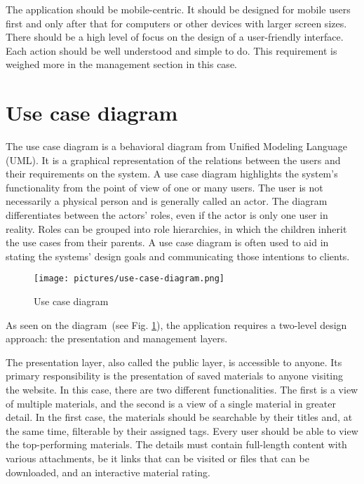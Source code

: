 \documentclass[
  digital,     %
  oneside,     %
  nosansbold,  %
  colorbold, %
  lof,         %
  lot,         %
]{fithesis4}
\newcommand{\imgref}[1]{(see Fig. \ref{fig:#1})}
\begin{document}
The application should be mobile-centric. It should be designed for mobile users first and only after
that for computers or other devices with larger screen sizes. There should be a high level of focus on
the design of a user-friendly interface. Each action should be well understood and simple to do. This
requirement is weighed more in the management section in this case.

\section{Use case diagram}

The use case diagram is a behavioral diagram from Unified Modeling Language (UML). It is a graphical
representation of the relations between the users and their requirements on the system. A use case
diagram highlights the system's functionality from the point of view of one or many users. The user is
not necessarily a physical person and is generally called an actor. The diagram differentiates between
the actors' roles, even if the actor is only one user in reality. Roles can be grouped into role
hierarchies, in which the children inherit the use cases from their parents. A use case diagram is often
used to aid in stating the systems' design goals and communicating those intentions to clients.

\begin{figure}
	\begin{center}
		\begin{minipage}{1\textwidth}
			\texttt{[image: pictures/use-case-diagram.png]}
		\end{minipage}
	\end{center}
	\caption{Use case diagram}
	\label{fig:use-case}
\end{figure}

As seen on the diagram~\imgref{use-case}, the application requires a two-level design approach: the
presentation and management layers.

The presentation layer, also called the public layer, is accessible to anyone. Its primary responsibility is
the presentation of saved materials to anyone visiting the website. In this case, there are two
different functionalities. The first is a view of multiple materials, and the second is a view of a single
material in greater detail. In the first case, the materials should be searchable by their titles and, at
the same time, filterable by their assigned tags. Every user should be able to view the top-performing
materials. The details must contain full-length content with various attachments, be it links that can
be visited or files that can be downloaded, and an interactive material rating.
\end{document}
